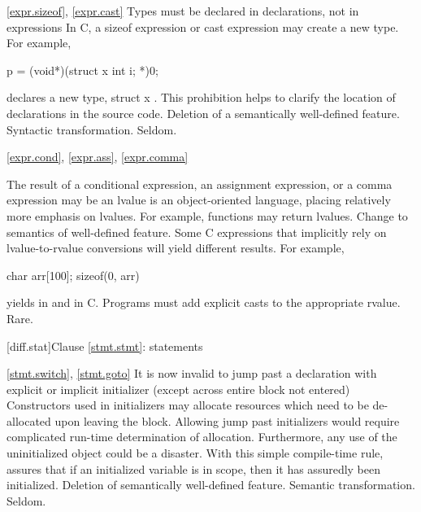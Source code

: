 \ref{expr.sizeof}, \ref{expr.cast}
\change Types must be declared in declarations, not in expressions
In C, a sizeof expression or cast expression may create a new type.
For example,
\begin{codeblock}
p = (void*)(struct x {int i;} *)0;
\end{codeblock}
declares a new type, struct x .
\rationale
This prohibition helps to clarify the location of
declarations in the source code.
\effect
Deletion of a semantically well-defined feature.
\difficulty
Syntactic transformation.
\howwide
Seldom.

\ref{expr.cond}, \ref{expr.ass}, \ref{expr.comma}

%
%
%
\change The result of a conditional expression, an assignment expression, or a comma expression may be an lvalue
\rationale
\Cpp is an object-oriented language, placing relatively
more emphasis on lvalues.  For example, functions may
return lvalues.
\effect
Change to semantics of well-defined feature.  Some C
expressions that implicitly rely on lvalue-to-rvalue
conversions will yield different results.  For example,

\begin{codeblock}
char arr[100];
sizeof(0, arr)
\end{codeblock}

yields
in \Cpp and
in C.
\difficulty
Programs must add explicit casts to the appropriate rvalue.
\howwide
Rare.

[diff.stat]{Clause \ref{stmt.stmt}: statements}

\ref{stmt.switch}, \ref{stmt.goto}
\change It is now invalid to jump past a declaration with explicit or implicit initializer (except across entire block not entered)
\rationale
Constructors used in initializers may allocate
resources which need to be de-allocated upon leaving the
block.
Allowing jump past initializers would require
complicated run-time determination of allocation.
Furthermore, any use of the uninitialized object could be a
disaster.
With this simple compile-time rule, \Cpp assures that
if an initialized variable is in scope, then it has assuredly been
initialized.
\effect
Deletion of semantically well-defined feature.
\difficulty
Semantic transformation.
\howwide
Seldom.

